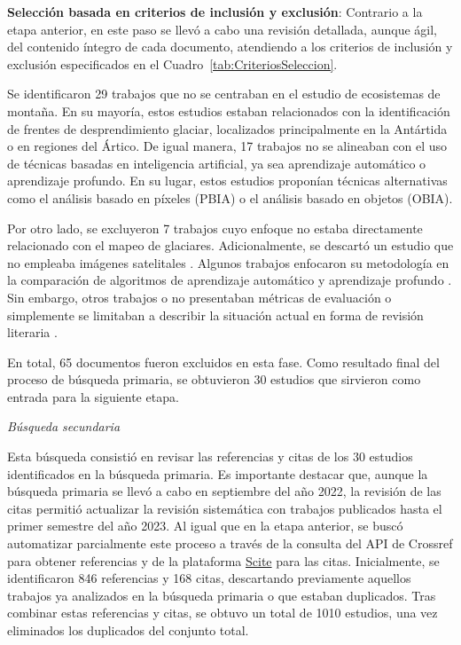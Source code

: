 \textbf{Selección basada en criterios de inclusión y exclusión}: Contrario a la etapa anterior, en este paso se llevó a cabo una revisión detallada, aunque ágil, del contenido íntegro de cada documento, atendiendo a los criterios de inclusión y exclusión especificados en el Cuadro~\ref{tab:CriteriosSeleccion}.

Se identificaron 29 trabajos que no se centraban en el estudio de ecosistemas de montaña. En su mayoría, estos estudios estaban relacionados con la identificación de frentes de desprendimiento glaciar, localizados principalmente en la Antártida o en regiones del Ártico. De igual manera, 17 trabajos no se alineaban con el uso de técnicas basadas en inteligencia artificial, ya sea aprendizaje automático o aprendizaje profundo. En su lugar, estos estudios proponían técnicas alternativas como el análisis basado en píxeles (PBIA) o el análisis basado en objetos (OBIA).

Por otro lado, se excluyeron 7 trabajos cuyo enfoque no estaba directamente relacionado con el mapeo de glaciares. Adicionalmente, se descartó un estudio que no empleaba imágenes satelitales \cite{kattenborn2019convolutional}. Algunos trabajos enfocaron su metodología en la comparación de algoritmos de aprendizaje automático y aprendizaje profundo \cite{khan2020machine, xie2021evaluating}. Sin embargo, otros trabajos o no presentaban métricas de evaluación o simplemente se limitaban a describir la situación actual en forma de revisión literaria \cite{kaushik2019development}.

En total, 65 documentos fueron excluidos en esta fase. Como resultado final del proceso de búsqueda primaria, se obtuvieron 30 estudios que sirvieron como entrada para la siguiente etapa.

\textit{Búsqueda secundaria}

Esta búsqueda consistió en revisar las referencias y citas de los 30 estudios identificados en la búsqueda primaria. Es importante destacar que, aunque la búsqueda primaria se llevó a cabo en septiembre del año 2022, la revisión de las citas permitió actualizar la revisión sistemática con trabajos publicados hasta el primer semestre del año 2023. Al igual que en la etapa anterior, se buscó automatizar parcialmente este proceso a través de la consulta del API de Crossref para obtener referencias y de la plataforma \href{https://www.scite.ai}{Scite} para las citas. Inicialmente, se identificaron 846 referencias y 168 citas, descartando previamente aquellos trabajos ya analizados en la búsqueda primaria o que estaban duplicados. Tras combinar estas referencias y citas, se obtuvo un total de 1010 estudios, una vez eliminados los duplicados del conjunto total.

